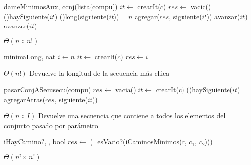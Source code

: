\begin{Algoritmos}
  \begin{algoritmo}{dameMinimosAux}{, }{conj(lista(compu))}
     $it \gets$ crearIt($c$)
    $res \gets$ vacio() 
    \While(){haySiguiente($it$)}{
      \eIf(){long(siguiente($it$))$=n$}{
        agregar($res$, siguiente($it$))
        avanzar($it$) 
      }{
        avanzar($it$) 
      }
    }
  \end{algoritmo}
  \datosAlgoritmo{} %
  {} %
  {} %
  {$\Theta(n \times n!)$} %
  {} %

  \begin{algoritmo}{minimaLong}{, }{nat}
     $i \gets n$
     $it \gets$ crearIt($c$)
    $res \gets i$
  \end{algoritmo}
  \datosAlgoritmo{} %
  {} %
  {} %
  {$\Theta(n!)$} %
  {Devuelve la longitud de la secuencia m\'{a}s chica} %
    
	\begin{algoritmo}{pasarConjASecu}{}{secu(compu)}{}
		$res \gets$ vacia()
		 $it \gets$ crearIt(c)
		\While(){haySiguiente($it$)}{
			agregarAtras($res$, siguiente($it$)) 		
		}
	\end{algoritmo}    
  \datosAlgoritmo{} %
  {} %
  {} %
  {$\Theta(n \times I)$} %
  {Devuelve una secuencia que contiene a todos los elementos del conjunto pasado por par\'{a}metro} %
     
  \begin{algoritmo}{iHayCamino?}{, , }{bool}{}
    $res \gets$ ($\neg$esVacio?(iCaminosMinimos($r$, $c_{1}$, $c_{2}$))) 
  \end{algoritmo}
  \datosAlgoritmo{} %
  {} %
  {} %
  {$\Theta(n² \times n!)$} %
  {} %


\end{Algoritmos}
